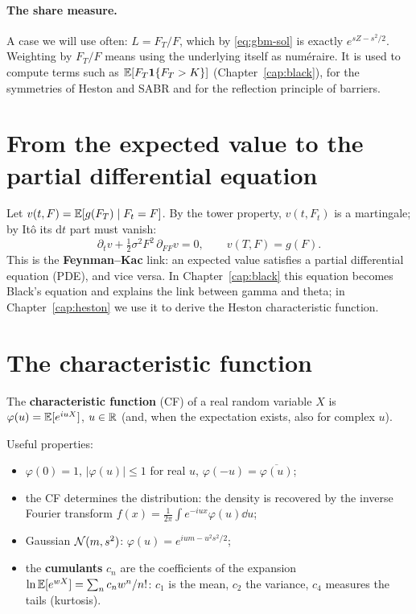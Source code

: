 \paragraph{The share measure.} A case we will use often: $L=F_T/F$, which by \eqref{eq:gbm-sol} is exactly
$e^{sZ-s^2/2}$. Weighting by $F_T/F$ means using the underlying itself as numéraire. It is used to compute terms such
as $\mathbb{E}[F_T\mathbf{1}\{F_T>K\}]$ (Chapter~\ref{cap:black}), for the symmetries of Heston and SABR and for the reflection
principle of barriers.

\section{From the expected value to the partial differential equation}
Let $v(t,F)=\mathbb{E}[g(F_T)\mid F_t=F]$. By the tower property, $v(t,F_t)$ is a martingale; by Itô its $\mathrm{d}t$ part
must vanish:
\begin{equation}\label{eq:feynman-kac}
\partial_tv+\tfrac12\sigma^2F^2\,\partial_{FF}v=0,\qquad v(T,F)=g(F).
\end{equation}
This is the \textbf{Feynman--Kac} link: an expected value satisfies a partial differential equation (PDE), and vice
versa. In Chapter~\ref{cap:black} this equation becomes Black's equation and explains the link between gamma and
theta; in Chapter~\ref{cap:heston} we use it to derive the Heston characteristic function.

\section{The characteristic function}
\begin{definizione}
The \textbf{characteristic function} (CF) of a real random variable $X$ is $\varphi(u)=\mathbb{E}[e^{iuX}]$, $u\in\mathbb{R}$ (and,
when the expectation exists, also for complex $u$).
\end{definizione}

\noindent Useful properties:
\begin{itemize}
\item $\varphi(0)=1$, $|\varphi(u)|\le1$ for real $u$, $\varphi(-u)=\overline{\varphi(u)}$;
\item the CF determines the distribution: the density is recovered by the inverse Fourier transform
$f(x)=\frac1{2\pi}\int e^{-iux}\varphi(u)\dd u$;
\item Gaussian $\mathcal{N}(m,s^2)$: $\varphi(u)=e^{ium-u^2s^2/2}$;
\item the \textbf{cumulants} $c_n$ are the coefficients of the expansion $\ln\mathbb{E}[e^{wX}]=\sum_nc_nw^n/n!$: $c_1$ is
the mean, $c_2$ the variance, $c_4$ measures the tails (kurtosis).
\end{itemize}

